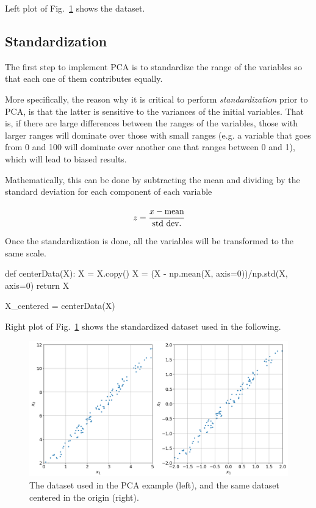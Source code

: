Left plot of Fig.~\ref{fig:pca_dataset} shows the dataset.

\subsection{Standardization}
The first step to implement PCA is to standardize the range of the variables so that each one of them contributes equally.

More specifically, the reason why it is critical to perform \emph{standardization} prior to PCA, is that the latter is sensitive to the variances of the initial variables. That is, if there are large differences between the ranges of the variables, those with larger ranges will dominate over those with small ranges (e.g. a variable that goes from 0 and 100 will dominate over another one that ranges between 0 and 1), which will lead to biased results. 

Mathematically, this can be done by subtracting the mean and dividing by the standard deviation for each component of each variable

\begin{equation}
z = \cfrac{x - \textrm{mean}}{\textrm{std dev.}}
\end{equation}

Once the standardization is done, all the variables will be transformed to the same scale.

\begin{ipython}
def centerData(X):
    X = X.copy()
    X = (X - np.mean(X, axis=0))/np.std(X, axis=0)
    return X
    
X_centered = centerData(X)
\end{ipython}

Right plot of Fig.~\ref{fig:pca_dataset} shows the standardized dataset used in the following.

\begin{figure}[htb]
	\centering
	\includegraphics[width=0.9\linewidth]{figures/pca_dataset_both}
	\caption{The dataset used in the PCA example (left), and the same dataset centered in the origin (right).}
	\label{fig:pca_dataset}
\end{figure}

